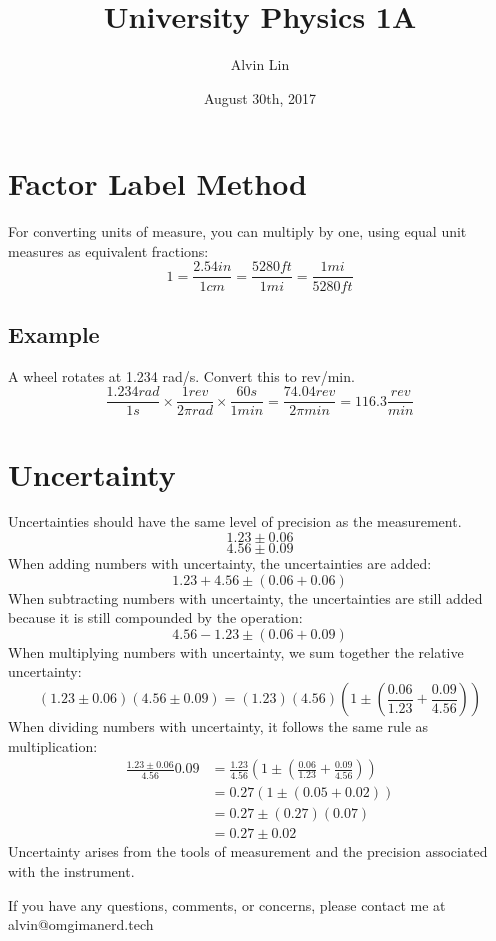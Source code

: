 \documentclass[letterpaper, 12pt]{math}
\title{University Physics 1A}
\author{Alvin Lin}
\date{August 30th, 2017}
\begin{document}
\maketitle

\section*{Factor Label Method}
For converting units of measure, you can multiply by one, using equal unit
measures as equivalent fractions:
\[ 1 = \frac{2.54in}{1cm} = \frac{5280ft}{1mi} = \frac{1mi}{5280ft} \]

\subsection*{Example}
A wheel rotates at 1.234 rad/s. Convert this to rev/min.
\[ \frac{1.234rad}{1s}\times\frac{1rev}{2\pi rad}\times\frac{60s}{1min} =
  \frac{74.04rev}{2\pi min} = 116.3\frac{rev}{min} \]

\section*{Uncertainty}
Uncertainties should have the same level of precision as the measurement.
\[ 1.23\pm0.06 \]
\[ 4.56\pm0.09 \]
When adding numbers with uncertainty, the uncertainties are added:
\[ 1.23+4.56\pm(0.06+0.06) \]
When subtracting numbers with uncertainty, the uncertainties are still
added because it is still compounded by the operation:
\[ 4.56-1.23\pm(0.06+0.09) \]
When multiplying numbers with uncertainty, we sum together the relative
uncertainty:
\[ (1.23\pm0.06)(4.56\pm0.09) =
  (1.23)(4.56)(1\pm(\frac{0.06}{1.23}+\frac{0.09}{4.56})) \]
When dividing numbers with uncertainty, it follows the same rule as
multiplication:
\begin{align*}
  \frac{1.23\pm0.06}{4.56}{0.09} &=
    \frac{1.23}{4.56}(1\pm(\frac{0.06}{1.23}+\frac{0.09}{4.56})) \\
  &= 0.27(1\pm(0.05+0.02)) \\
  &= 0.27\pm(0.27)(0.07) \\
  &= 0.27\pm0.02
\end{align*}
Uncertainty arises from the tools of measurement and the precision associated
with the instrument.

\begin{center}
  If you have any questions, comments, or concerns, please contact me at
  alvin@omgimanerd.tech
\end{center}
\end{document}
